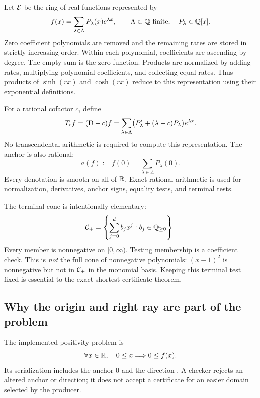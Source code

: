 Let $\mathcal E$ be the ring of real functions represented by
\begin{equation}
 f(x)=\sum_{\lambda\in\Lambda}P_\lambda(x)e^{\lambda x},
 \qquad \Lambda\subset\mathbb Q\text{ finite},\quad P_\lambda\in\mathbb Q[x].
 \label{eq:exp-poly}
\end{equation}
Zero coefficient polynomials are removed and the remaining rates are stored in strictly increasing order. Within each polynomial, coefficients are ascending by degree. The empty sum is the zero function. Products are normalized by adding rates, multiplying polynomial coefficients, and collecting equal rates. Thus products of $\sinh(rx)$ and $\cosh(rx)$ reduce to this representation using their exponential definitions.

For a rational cofactor $c$, define
\begin{equation}
 T_c f=(\mathrm D-c)f
 =\sum_{\lambda\in\Lambda}
 \bigl(P'_\lambda+(\lambda-c)P_\lambda\bigr)e^{\lambda x}.
 \label{eq:cofactor}
\end{equation}
No transcendental arithmetic is required to compute this representation. The anchor is also rational:
\begin{equation}
 a(f):=f(0)=\sum_{\lambda\in\Lambda}P_\lambda(0).
 \label{eq:anchor}
\end{equation}
Every denotation is smooth on all of $\mathbb R$. Exact rational arithmetic is used for normalization, derivatives, anchor signs, equality tests, and terminal tests.

The terminal cone is intentionally elementary:
\[
 \mathcal C_+=\left\{\sum_{j=0}^{d}b_jx^j:b_j\in\mathbb Q_{\ge0}\right\}.
\]
Every member is nonnegative on $[0,\infty)$. Testing membership is a coefficient check. This is \emph{not} the full cone of nonnegative polynomials: $(x-1)^2$ is nonnegative but not in $\mathcal C_+$ in the monomial basis. Keeping this terminal test fixed is essential to the exact shortest-certificate theorem.

\subsection{Why the origin and right ray are part of the problem}

The implemented positivity problem is
\begin{equation}
 \forall x\in\mathbb R,\quad 0\le x\Longrightarrow0\le f(x).
 \label{eq:goal}
\end{equation}
Its serialization includes the anchor $0$ and the direction . A checker rejects an altered anchor or direction; it does not accept a certificate for an easier domain selected by the producer.

